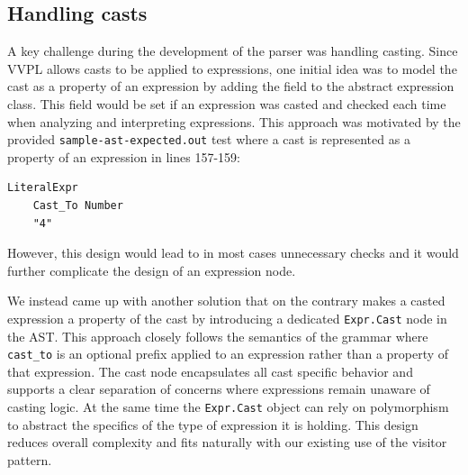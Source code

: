 \subsection{Handling casts}
A key challenge during the development of the parser was handling casting.
Since VVPL allows casts to be applied to expressions, one initial idea was to model
the cast as a property of an expression by adding the field  to
the abstract expression class.
This field would be set if an expression was casted
and checked each time when analyzing and interpreting expressions.
This approach was motivated by the provided \verb|sample-ast-expected.out| test
where a cast is represented as a property of an expression in lines 157-159:
\begin{lstlisting}[firstnumber=157]
LiteralExpr
    Cast_To Number
    "4"
\end{lstlisting}
However, this design would lead to in most cases unnecessary checks and it would further complicate
the design of an expression node.

We instead came up with another solution that on the contrary makes a casted expression a property of the cast
by introducing a dedicated \verb|Expr.Cast| node in the AST.
This approach closely follows the semantics of the grammar where \verb|cast_to| is an optional prefix applied
to an expression rather than a property of that expression.
The cast node encapsulates all cast specific behavior and supports a clear separation of concerns
where expressions remain unaware of casting logic.
At the same time the \verb|Expr.Cast| object can rely on polymorphism to abstract the specifics of the type of expression it is holding.
This design reduces overall complexity and fits naturally with our existing use of the visitor pattern.


